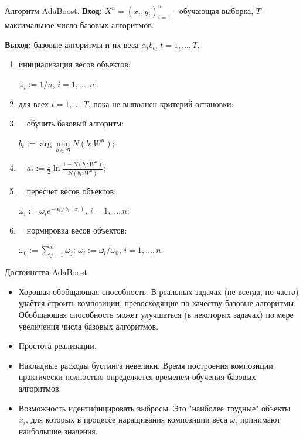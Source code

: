 \documentclass[10pt,unicode,notheorems]{beamer}
\begin{document}
\begin{frame}{Алгоритм AdaBoost.}
\textbf{Вход:} $X^n = (x_i,y_i)_{i=1}^n$ - обучающая выборка, $T$ - максимальное число базовых алгоритмов.
\vspace{0.2cm}

\textbf{Выход:} базовые алгоритмы и их веса $\alpha_t b_t$, $t = 1, \ldots, T$.
\vspace{0.2cm}

\begin{enumerate}
\item инициализация весов объектов: 

$\omega_i := 1/n$, $i = 1, \ldots, n$;
\item для всех $t=1,\ldots,T$, пока не выполнен критерий остановки:
\item   $\quad$обучить базовый алгоритм: 

$b_t := \arg \min \limits_{b \in \mathcal{B}} N(b; W^n)$;
\item   $\quad a_t := \frac{1}{2} \ln \frac{1-N(b_t; W^n)}{N(b_t; W^n)}$;
\item   $\quad$пересчет весов объектов: 

$\omega_i := \omega_i e^{−\alpha_t y_i b_t(x_i)}$, $i = 1, \ldots, n$;
\item   $\quad$нормировка весов объектов: 

$\omega_0 := \sum_{j=1}^{n} \omega_j$; $\omega_i:=\omega_i/\omega_0$, $i = 1, \ldots, n$.
\end{enumerate}
\end{frame}

\begin{frame}{Достоинства AdaBoost.}
\begin{itemize}
\item Хорошая обобщающая способность. В реальных задачах (не всегда, но часто) удаётся строить композиции, превосходящие по качеству базовые алгоритмы.
Обобщающая способность может улучшаться (в некоторых задачах) по мере
увеличения числа базовых алгоритмов.
\item Простота реализации.
\item Накладные расходы бустинга невелики. Время построения композиции практически полностью определяется временем обучения базовых алгоритмов.
\item Возможность идентифицировать выбросы. Это "наиболее трудные" объекты $x_i$, для которых в процессе наращивания композиции веса $\omega_i$ принимают наибольшие значения.
\end{itemize}
\end{frame}
\end{document}
